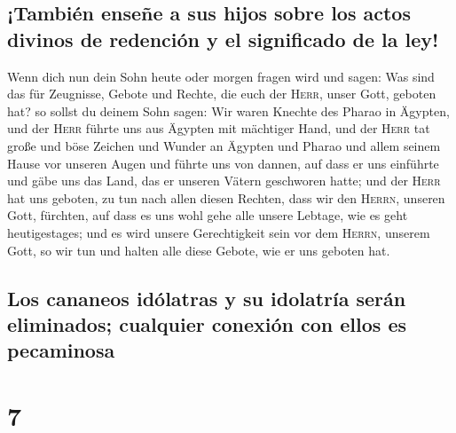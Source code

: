 \hypertarget{tambiuxe9n-enseuxf1e-a-sus-hijos-sobre-los-actos-divinos-de-redenciuxf3n-y-el-significado-de-la-ley}{%
\subsection{¡También enseñe a sus hijos sobre los actos divinos de
redención y el significado de la
ley!}\label{tambiuxe9n-enseuxf1e-a-sus-hijos-sobre-los-actos-divinos-de-redenciuxf3n-y-el-significado-de-la-ley}}

 Wenn dich nun dein Sohn heute oder morgen fragen wird
und sagen: Was sind das für Zeugnisse, Gebote und Rechte, die euch der
\textsc{Herr}, unser Gott, geboten hat?  so sollst du
deinem Sohn sagen: Wir waren Knechte des Pharao in Ägypten, und der
\textsc{Herr} führte uns aus Ägypten mit mächtiger Hand, 
und der \textsc{Herr} tat große und böse Zeichen und Wunder an Ägypten
und Pharao und allem seinem Hause vor unseren Augen  und
führte uns von dannen, auf dass er uns einführte und gäbe uns das Land,
das er unseren Vätern geschworen hatte;  und der
\textsc{Herr} hat uns geboten, zu tun nach allen diesen Rechten, dass
wir den \textsc{Herrn}, unseren Gott, fürchten, auf dass es uns wohl
gehe alle unsere Lebtage, wie es geht heutigestages;  und
es wird unsere Gerechtigkeit sein vor dem \textsc{Herrn}, unserem Gott,
so wir tun und halten alle diese Gebote, wie er uns geboten hat.

\hypertarget{los-cananeos-iduxf3latras-y-su-idolatruxeda-seruxe1n-eliminados-cualquier-conexiuxf3n-con-ellos-es-pecaminosa}{%
\subsection{Los cananeos idólatras y su idolatría serán eliminados;
cualquier conexión con ellos es
pecaminosa}\label{los-cananeos-iduxf3latras-y-su-idolatruxeda-seruxe1n-eliminados-cualquier-conexiuxf3n-con-ellos-es-pecaminosa}}

\hypertarget{section-6}{%
\section{7}\label{section-6}}


